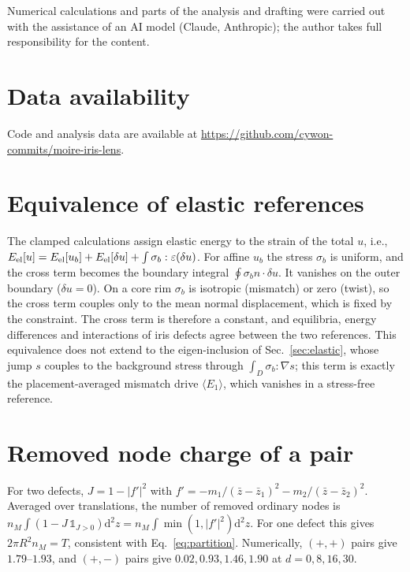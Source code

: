 \documentclass[prb,twocolumn,superscriptaddress,floatfix,10pt]{revtex4-2}
\newcommand{\dd}{\mathrm{d}}
\begin{document}
\begin{acknowledgments}
Numerical calculations and parts of the analysis and drafting were carried out with the assistance of an AI model (Claude, Anthropic); the author takes full responsibility for the content.
\end{acknowledgments}

\section*{Data availability}
Code and analysis data are available at \url{https://github.com/cywon-commits/moire-iris-lens}.

\appendix

\section{Equivalence of elastic references}\label{app:ref}
The clamped calculations assign elastic energy to the strain of the total $u$, i.e., $E_{\rm el}[u]=E_{\rm el}[u_b]+E_{\rm el}[\delta u]+\int\sigma_b:\varepsilon(\delta u)$. For affine $u_b$ the stress $\sigma_b$ is uniform, and the cross term becomes the boundary integral $\oint\sigma_bn\cdot\delta u$. It vanishes on the outer boundary ($\delta u=0$). On a core rim $\sigma_b$ is isotropic (mismatch) or zero (twist), so the cross term couples only to the mean normal displacement, which is fixed by the constraint. The cross term is therefore a constant, and equilibria, energy differences and interactions of iris defects agree between the two references. This equivalence does not extend to the eigen-inclusion of Sec.~\ref{sec:elastic}, whose jump $s$ couples to the background stress through $\int_D\sigma_b:\nabla s$; this term is exactly the placement-averaged mismatch drive $\langle E_1\rangle$, which vanishes in a stress-free reference.

\section{Removed node charge of a pair}\label{app:pair}
For two defects, $J=1-|f'|^2$ with $f'=-m_1/(\bar z-\bar z_1)^2-m_2/(\bar z-\bar z_2)^2$. Averaged over translations, the number of removed ordinary nodes is $n_M\int(1-J\,\mathbb{1}_{J>0})\dd^2z=n_M\int\min(1,|f'|^2)\dd^2z$. For one defect this gives $2\pi R^2n_M=T$, consistent with Eq.~\eqref{eq:partition}. Numerically, $(+,+)$ pairs give $1.79$--$1.93$, and $(+,-)$ pairs give $0.02,0.93,1.46,1.90$ at $d=0,8,16,30$.
\end{document}

